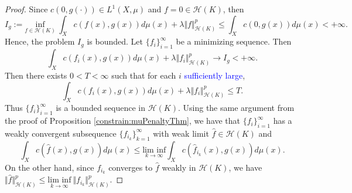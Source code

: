 \documentclass{amsart}
\numberwithin{equation}{section}
\theoremstyle{plain}
\theoremstyle{remark}
\theoremstyle{definition}
\begin{document}
\begin{proof}
Since  $c(0, g(\cdot)) \in L^1(X,\mu)$ and $f=0 \in \mathscr{H}(K)$, then 
 \begin{equation*}
   I_g:= \underset{f \in \mathscr{H}(K)}{\text{inf}} \ \int_{X} c( f(x), g(x))  d\mu(x) + \lambda \Vert f \Vert^p_{\mathscr{H}(K)} \leq \int_{X} c(0, g(x)) d\mu(x)  < + \infty.
\end{equation*}
Hence, the problem $I_g$ is bounded. Let $\{f_i\}_{i=1}^{\infty}$ be a minimizing sequence. Then
\begin{equation*}
     \int_{X} c( f_i(x), g(x))  d\mu(x) + \lambda \Vert f_i \Vert^p_{\mathscr{H}(K)} \rightarrow I_g < + \infty.
\end{equation*}
Then  there exists $0<T<\infty$ such that for each $i$ \textcolor{blue}{sufficiently large}, 
\begin{equation*}
    \int_{X} c( f_i(x), g(x))  d\mu(x) + \lambda \Vert f_i \Vert^p_{\mathscr{H}(K)}  \leq  T.
\end{equation*}
Thus  $\{f_i\}_{i=1}^{\infty}$ is a bounded sequence in $\mathscr{H}(K)$. 
Using the same argument from the proof of Proposition \ref{constrain:muPenaltyThm}, we have that $\{f_i\}_{i=1}^{\infty}$ has a weakly convergent subsequence $\{f_{i_k}\}_{k=1}^{\infty}$ with weak limit $\hat{f} \in \mathscr{H}(K)$ and
\begin{equation*}
    \int_{X}  c( \hat{f}(x), g(x)) d\mu(x) \leq  \underset{k \rightarrow \infty}{\text{lim inf}} \int_{X}  c( \hat{f}_{i_k}(x), g(x)) d\mu(x).
\end{equation*}
On the other hand, since $f_{i_k}$ converges to $\hat{f}$ weakly in $\mathscr{H}(K)$, we have $\Vert \hat{f} \Vert_{\mathscr{H}(K)}^p \leq  \underset{k \rightarrow \infty}{\text{lim inf}}  \ \Vert f_{i_k} \Vert_{\mathscr{H}(K)}^p.$

\end{proof}
\end{document}
